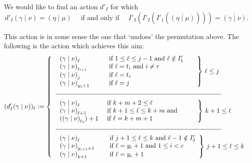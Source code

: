 \documentclass[ALCO]{cedram}
\newcommand{\gammanu}{{(\gamma \mid \nu)}}
\newcommand{\dtwo}{d'_I}
\begin{document}
We would like to find an action $\dtwo$ for which
\[ \dtwo \gammanu=(\eta \mid \mu) \quad \text{ if and only if } \quad  I'_3 \left(I'_2\left(I'_1\left(\overline{(\eta \mid \mu)}\right) \right)  \right)= \overline{\gammanu}.\]

This action is in some sense the one that `undoes' the permutation above. The following is the action which achieves this aim:
\[ (\dtwo \gammanu)_\ell := \left\{\begin{tabular}{l l} $ \left.\begin{array}{l l} \gammanu_\ell  &\text{ if } 1\leq \ell\leq j-1 \text{ and } \ell\notin I'_1 \\
\gammanu_{t_{i+1}} &\text{ if } \ell=t_i \text{ and } i\neq r\\
\gammanu_{j} \hspace*{1.1cm} &\text{ if } \ell=t_r\\
\gammanu_{y_1+1} &\text{ if } \ell=j
\end{array} \hspace{.55cm} \right\} \, \ell \leq j$ \\
\underline{\hspace{9cm}}\\[2mm]
$\left.\begin{array}{l l} 
\gammanu_\ell &\text{ if } k+m+2 \leq \ell \\
\gammanu_{\ell+1} &\text{ if } k+1 \leq \ell \leq k+m \text{ and } \\
(\gammanu_{t_1}) + 1&\text{ if } \ell=k+m+1 
\hspace*{2.25cm} \end{array} \right\} \, k+1 \leq \ell $\\
\underline{\hspace{9cm}}\\[2mm] $\left.\begin{array}{l l} \gammanu_{\ell} &\text{ if } j+1 \leq \ell \leq k \text{ and } \ell-1 \notin I'_3\\
\gammanu_{y_{i+1}+1} \hspace*{.35cm}&\text{ if } \ell=y_i+1 \text{ and } 1 \leq i < c\\
\gammanu_{k+1}&\text{ if } \ell=y_c+1 \hspace*{2.75cm}\\ \end{array} \right\} \, j+1 \leq \ell \leq k $
 \end{tabular}  \right.\]
 
\end{document}
